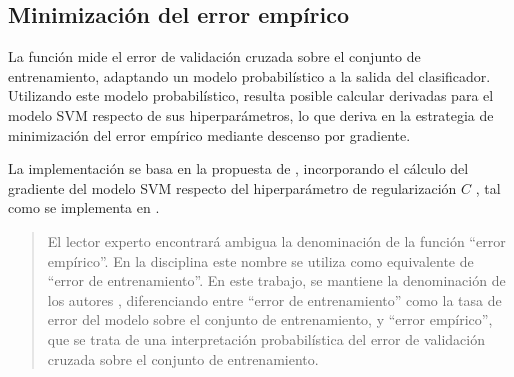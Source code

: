 %
%
\subsection{Minimización del error empírico}
%
La función  mide el error de
validación cruzada sobre el conjunto de entrenamiento, adaptando un
modelo probabilístico a la salida del clasificador.
Utilizando este modelo probabilístico,
resulta posible calcular derivadas para el modelo SVM respecto de sus
hiperparámetros, lo que deriva en la estrategia de minimización del
error empírico mediante descenso por gradiente.

La implementación se basa en la propuesta de \cite{ayat}, incorporando
el cálculo del gradiente del modelo SVM respecto del hiperparámetro de
regularización $C$ \cite{keerthi,glasmachers}, tal como se implementa
en \cite{shark}.
%
\begin{quote}
  El lector experto encontrará ambigua la denominación de la función
  ``error empírico''.  En la disciplina este nombre se utiliza como
  equivalente de ``error de entrenamiento''.  En este trabajo, se
  mantiene la denominación de los autores \cite{ayat}, diferenciando
  entre ``error de entrenamiento'' como la tasa de error del modelo
  sobre el conjunto de entrenamiento, y ``error empírico'', que se
  trata de una interpretación probabilística del error de validación
  cruzada sobre el conjunto de entrenamiento.
\end{quote}
%
